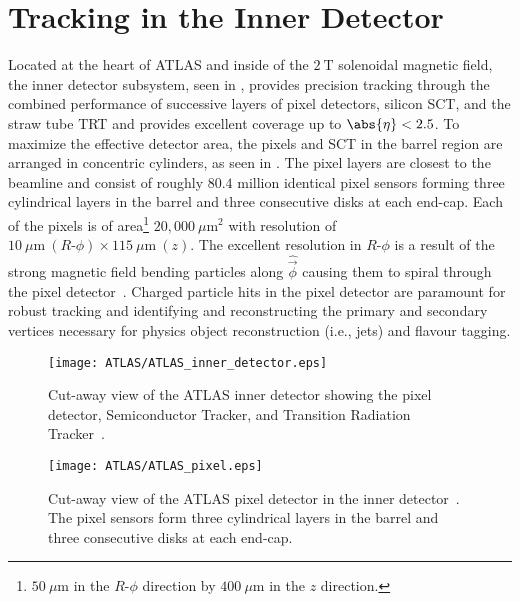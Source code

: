 \section{Tracking in the Inner Detector}\label{sec:ATLAS_ID}

Located at the heart of ATLAS and inside of the $2~\mathrm{T}$ solenoidal magnetic field, the \gls{inner detector} subsystem, seen in , provides precision tracking through the combined performance of successive layers of pixel detectors, silicon \gls{SCT}, and the straw tube \gls{TRT} and provides excellent coverage up to $\abs{\eta} < 2.5$.
To maximize the effective detector area, the pixels and SCT in the barrel region are arranged in concentric cylinders, as seen in .
The pixel layers are closest to the beamline and consist of roughly $80.4$ million identical pixel sensors forming three cylindrical layers in the barrel and three consecutive disks at each end-cap.
Each of the pixels is of area\footnote{$50~\mu\mathrm{m}$ in the $R\textrm{-}\phi$ direction by $400~\mu\mathrm{m}$ in the $z$ direction.} $20,000~\mu\mathrm{m}^{2}$ with resolution of $10~\mu\mathrm{m}~(R\textrm{-}\phi) \times 115~\mu\mathrm{m}~(z)$.
The excellent resolution in $R\textrm{-}\phi$ is a result of the strong magnetic field bending particles along $\hat{\vec{\phi}}$ causing them to spiral through the pixel detector~\cite{PERF-2007-01}.
Charged particle hits in the pixel detector are paramount for robust tracking and identifying and reconstructing the primary and secondary vertices necessary for physics object reconstruction (i.e., jets) and flavour tagging.

\begin{figure}[htbp]
 \centering
 \texttt{[image: ATLAS/ATLAS\_inner\_detector.eps]}
 \caption[Cut-away view of the ATLAS inner detector showing the pixel detector, Semiconductor Tracker, and Transition Radiation Tracker.]{%
  Cut-away view of the ATLAS inner detector showing the pixel detector, Semiconductor Tracker, and Transition Radiation Tracker~\cite{Pequenao:1095926}.}\label{fig:ATLAS_inner_detector}
\end{figure}

\begin{figure}[htbp]
 \centering
 \texttt{[image: ATLAS/ATLAS\_pixel.eps]}
 \caption[Cut-away view of the ATLAS pixel detector in the inner detector.]{%
  Cut-away view of the ATLAS pixel detector in the inner detector~\cite{Pequenao:1095925}.
  The pixel sensors form three cylindrical layers in the barrel and three consecutive disks at each end-cap.}\label{fig:ATLAS_pixel}
\end{figure}

